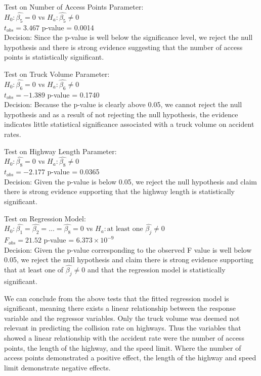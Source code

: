 \documentclass[12pt]{report}
\begin{document}
Test on Number of Access Points Parameter:
\\$H_{0}: \hat{\beta_{5}} = 0$ vs $H_{a}: \hat{\beta_{5}} \neq 0$
\\$t_{obs} = 3.467$ \quad p-value = 0.0014
\\Decision: Since the p-value is well below the significance level, we reject the null hypothesis and there is strong evidence suggesting that the number of access points is statistically significant.

Test on Truck Volume Parameter:
\\$H_{0}: \hat{\beta_{6}} = 0$ vs $H_{a}: \hat{\beta_{6}} \neq 0$
\\$t_{obs} = -1.389$ \quad p-value = 0.1740
\\Decision: Because the p-value is clearly above 0.05, we cannot reject the null hypothesis and as a result of not rejecting the null hypothesis, the evidence indicates little statistical significance associated with a truck volume on accident rates.

Test on Highway Length Parameter:
\\$H_{0}: \hat{\beta_{8}} = 0$ vs $H_{a}: \hat{\beta_{8}} \neq 0$
\\$t_{obs} = -2.177$ \quad p-value = 0.0365
\\Decision: Given the p-value is below 0.05, we reject the null hypothesis and claim there is strong evidence supporting that the highway length is statistically significant.

Test on Regression Model:
\\$H_{0}: \hat{\beta_{1}} = \hat{\beta_{2}} = ... =\hat{\beta_{8}} = 0$ vs $H_{a}: \text{at least one }\hat{\beta_{j}} \neq 0$
\\$F_{obs} = 21.52$ \quad p-value = $6.373 \times 10^{-9}$
\\Decision: Given the p-value corresponding to the observed F value is well below 0.05, we reject the null hypothesis and claim there is strong evidence supporting that at least one of $\hat{\beta_{j}} \neq 0$ and that the regression model is statistically significant.
\bigskip

We can conclude from the above tests that the fitted regression model is significant, meaning there exists a linear relationship between the response variable and the regressor variables. Only the truck volume was deemed not relevant in predicting the collision rate on highways. Thus the variables that showed a linear relationship with the accident rate were the number of access points, the length of the highway, and the speed limit. Where the number of access points demonstrated a positive effect, the length of the highway and speed limit demonstrate negative effects.
\end{document}
